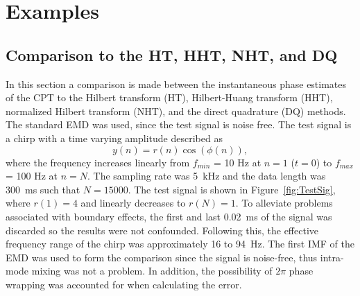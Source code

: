 \documentclass[a4paper]{IEEEtran}
\begin{document}
% 



\section{Examples}\label{sect:Examples}
\subsection{Comparison to the HT, HHT, NHT, and DQ}
In this section a comparison is made between the instantaneous phase estimates of the CPT to the Hilbert transform (HT), Hilbert-Huang transform (HHT), normalized Hilbert transform (NHT), and the direct quadrature (DQ) methods. The standard EMD was used, since the test signal is noise free. The test signal is a chirp with a time varying amplitude described as
\begin{equation}\label{TestSigNoNoise}
    y(n)=r\left(n\right)\cos\left(\phi\left(n\right)\right),
\end{equation}
where the frequency increases linearly from $f_{min}$ = 10 Hz at $n=1$ ($t=0$) to $f_{max}$ = 100 Hz at $n=N$. The sampling rate was 5~kHz and the data length was 300~ms such that $N = 15000$. The test signal is shown in Figure~\ref{fig:TestSig}, where $r(1) = 4$ and linearly decreases to $r(N) = 1$. To alleviate problems associated with boundary effects, the first and last 0.02~ms of the signal was discarded so the results were not confounded. Following this, the effective frequency range of the chirp was approximately 16 to 94~Hz. The first IMF of the EMD was used to form the comparison since the signal is noise-free, thus intra-mode mixing was not a problem. In addition, the possibility of $2\pi$ phase wrapping was accounted for when calculating the error.
\end{document}
